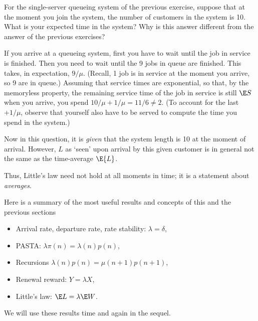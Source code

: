 \begin{exercise}
  For the  single-server queueing system of the previous exercise, 
 suppose that at the moment you join the system, the number of
    customers in the system is 10. What is your expected time in the
    system? 
 Why is this answer different from the answer of the previous exercises?
    \begin{solution}
If you arrive at a queueing system, first you have to wait until the job in service is finished.  Then you need to wait until the 9 jobs in queue are finished. This takes, in expectation, $9/\mu$. (Recall, 1 job is in service at the moment you arrive, so 9 are in queue.) Assuming that service times are exponential, so that, by the memoryless property, the remaining service time of the job in service is still $\E S$ when you arrive, you spend $10/\mu + 1/\mu = 11/6 \neq 2$. (To account for the last $+1/\mu$, observe that yourself also have to be served to compute the time you spend in the system.)


Now  in this question, it is \emph{given} that the system
    length is 10 at the moment of arrival. However, $L$ as `seen' upon arrival by this
    given customer  is in general  not the same as the  time-average $\E{L}$.

Thus, Little's law need  not hold at all moments in time; it is a statement about \emph{averages}.
    \end{solution}

\end{exercise}

Here is a summary of the most useful results and concepts of this and the previous sections
\begin{itemize}
\item Arrival rate,  departure  rate, rate stability:  $\lambda = \delta$,
\item PASTA: $\lambda \pi(n) = \lambda(n) p(n)$,
\item Recursions $\lambda(n)p(n) = \mu(n+1) p(n+1)$,
\item Renewal reward: $Y=\lambda X$,
\item Little's law: $\E L =\lambda \E W$.
\end{itemize}
We will use these results time and again in the sequel.






